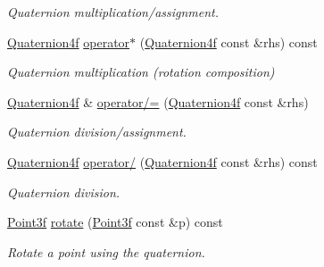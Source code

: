 \begin{DoxyCompactItemize}
\begin{DoxyCompactList}\small\item\em \-Quaternion multiplication/assignment. \end{DoxyCompactList}\item 
\hypertarget{classQuaternion4f_a1d9d76b4fdeb48bc07facc4c9f4e0077}{\hyperlink{classQuaternion4f}{\-Quaternion4f} \hyperlink{classQuaternion4f_a1d9d76b4fdeb48bc07facc4c9f4e0077}{operator$\ast$} (\hyperlink{classQuaternion4f}{\-Quaternion4f} const \&rhs) const }\label{classQuaternion4f_a1d9d76b4fdeb48bc07facc4c9f4e0077}

\begin{DoxyCompactList}\small\item\em \-Quaternion multiplication (rotation composition) \end{DoxyCompactList}\item 
\hypertarget{classQuaternion4f_ac14442267435abd2e8daf0fc81b5e435}{\hyperlink{classQuaternion4f}{\-Quaternion4f} \& \hyperlink{classQuaternion4f_ac14442267435abd2e8daf0fc81b5e435}{operator/=} (\hyperlink{classQuaternion4f}{\-Quaternion4f} const \&rhs)}\label{classQuaternion4f_ac14442267435abd2e8daf0fc81b5e435}

\begin{DoxyCompactList}\small\item\em \-Quaternion division/assignment. \end{DoxyCompactList}\item 
\hypertarget{classQuaternion4f_a608114a34406bfc9d451bf365edf81a8}{\hyperlink{classQuaternion4f}{\-Quaternion4f} \hyperlink{classQuaternion4f_a608114a34406bfc9d451bf365edf81a8}{operator/} (\hyperlink{classQuaternion4f}{\-Quaternion4f} const \&rhs) const }\label{classQuaternion4f_a608114a34406bfc9d451bf365edf81a8}

\begin{DoxyCompactList}\small\item\em \-Quaternion division. \end{DoxyCompactList}\item 
\hypertarget{classQuaternion4f_aeabc49bffd763065dc0e77ae26c9f6c6}{\hyperlink{classPoint3f}{\-Point3f} \hyperlink{classQuaternion4f_aeabc49bffd763065dc0e77ae26c9f6c6}{rotate} (\hyperlink{classPoint3f}{\-Point3f} const \&p) const }\label{classQuaternion4f_aeabc49bffd763065dc0e77ae26c9f6c6}

\begin{DoxyCompactList}\small\item\em \-Rotate a point using the quaternion. \end{DoxyCompactList}\end{DoxyCompactItemize}
